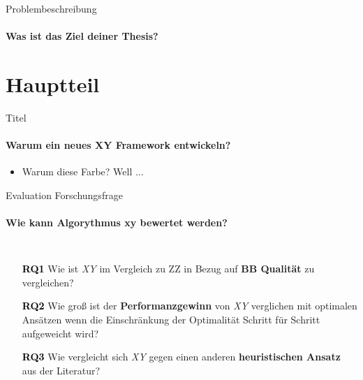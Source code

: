 \documentclass[
	german,%
	aspectratio=169,%
	accentcolor=1b,
	logo=true,%
	colorframetitle=true,%
	authorontitle=true,
	usepdftitle=false,
	design=2008,
	]{tudabeamer}
\begin{document}
\begin{frame}{Problembeschreibung}
	\framesubtitle{Was ist das Ziel deiner Thesis?}
	\label{goal}
\end{frame}

%
%

\section{Hauptteil}

\begin{frame}{Titel}
	\framesubtitle{Warum ein neues XY Framework entwickeln?}
	\label{framework}
	
	\begin{itemize}
		\item \textcolor{TUDa-0c}{Warum diese Farbe? Well $\ldots$}
	\end{itemize}
\end{frame}

\begin{frame}{Evaluation Forschungsfrage}
	\framesubtitle{Wie kann Algorythmus xy bewertet werden?}
	\label{eval-research-questions}
	
	\vspace{3.5em}

	\begin{columns}[onlytextwidth,c]
	
		\begin{itemize}
			\itemsep1.5em
			\item[\textcolor{black}{\textbf{RQ1}}] Wie ist \textit{XY} im Vergleich zu ZZ in Bezug auf \textbf{BB Qualität} zu vergleichen?
	
			\item[\textcolor{black}{\textbf{RQ2}}] Wie groß ist der \textbf{Performanzgewinn} von \textit{XY} verglichen mit optimalen Ansätzen wenn die Einschränkung der Optimalität Schritt für Schritt aufgeweicht wird?
			
			\item[\textcolor{black}{\textbf{RQ3}}] Wie vergleicht sich \textit{XY} gegen einen anderen \textbf{heuristischen Ansatz} aus der Literatur?
		\end{itemize}

	\end{columns}
	
\end{frame}
\end{document}
